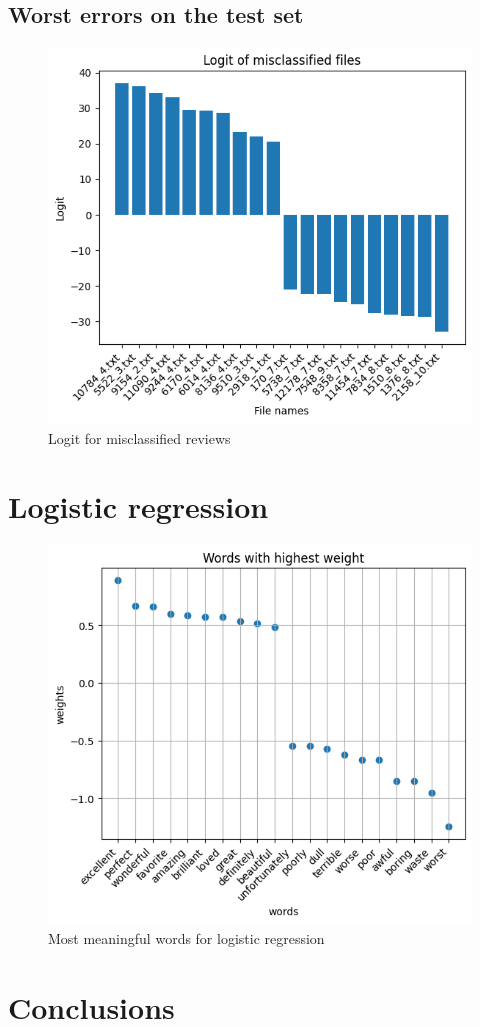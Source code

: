\documentclass[eng]{class}
\begin{document}
\subsection{Worst errors on the test set}
\begin{figure}[h]
  \centering
  \includegraphics[width=.5\columnwidth]{images/missclassified.png}
  \caption{Logit for misclassified reviews}
  \label{fig-4}
\end{figure}

\section{Logistic regression}
\begin{figure}[h]
  \centering
  \includegraphics[width=.5\columnwidth]{images/lrwords.png}
  \caption{Most meaningful words for logistic regression}
  \label{fig-5}
\end{figure}

\section{Conclusions}

\end{document}
